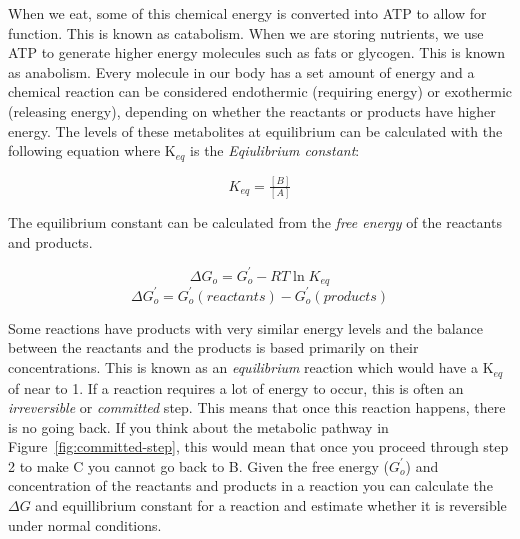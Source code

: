 \documentclass{tufte-handout}
\begin{document}
  When we eat, some of this chemical energy is converted into ATP to allow for function.  This is known as catabolism.  When we are storing nutrients, we use ATP to generate higher energy molecules such as fats or glycogen.  This is known as anabolism.  Every molecule in our body has a set amount of energy and a chemical reaction can be considered endothermic (requiring energy) or exothermic (releasing energy), depending on whether the reactants or products have higher energy.  The levels of these metabolites at equilibrium can be calculated with the following equation where K$_{eq}$ is the \emph{Eqiulibrium constant}:

\begin{equation}
K_{eq}=\tfrac{[B]}{[A]}
\end{equation}

 The equilibrium constant can be calculated from the \emph{free energy} of the reactants and products.

\begin{equation}
\Delta G_{o} = G^{'}_{o} - R T \ln K_{eq}
\end{equation}
\begin{equation}
\Delta G^{'}_{o} = G^{'}_{o} (reactants) - G^{'}_{o} (products) 
 \end{equation}


Some reactions have products with very similar energy levels and the balance between the reactants and the products is based primarily on their concentrations.  This is known as an \emph{equilibrium} reaction which would have a K$_{eq}$ of near to 1.  If a reaction requires a lot of energy to occur, this is often an \emph{irreversible} or \emph{committed} step.  This means that once this reaction happens, there is no going back.  If you think about the metabolic pathway in Figure~\ref{fig:committed-step}, this would mean that once you proceed through step 2 to make  C you cannot go back to B.  Given the free energy ($G^{'}_{o}$) and concentration of the reactants and products in a reaction you can calculate the $\Delta G$ and equillibrium constant for a reaction and estimate whether it is reversible under normal conditions.
\end{document}
